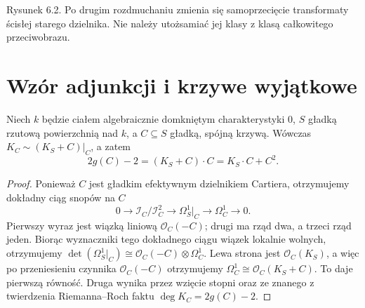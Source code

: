 \begin{center}
\begin{minipage}{\linewidth}
\centering
{}

{\small Rysunek 6.2. Po drugim rozdmuchaniu zmienia się samoprzecięcie transformaty ścisłej starego dzielnika. Nie należy utożsamiać jej klasy z klasą całkowitego przeciwobrazu.}\par
\end{minipage}
\end{center}

\section{Wzór adjunkcji i krzywe wyjątkowe}
\label{sec:ga6-adjunction}

\begin{twierdzenie}
\label{tw:ga6-adjunction}
Niech $k$ będzie ciałem algebraicznie domkniętym
charakterystyki $0$, $S$ gładką rzutową powierzchnią
nad $k$, a $C\subseteq S$ gładką, spójną krzywą.
Wówczas
$K_C\sim (K_S+C)|_C$, a zatem
\[
 2g(C)-2=(K_S+C)\cdot C=K_S\cdot C+C^2.
\]
\end{twierdzenie}
\begin{proof}
Ponieważ $C$ jest gładkim efektywnym dzielnikiem
Cartiera, otrzymujemy dokładny ciąg snopów na $C$
\[
0\longrightarrow\mathcal I_C/\mathcal I_C^2
 \longrightarrow\Omega^1_S|_C\longrightarrow\Omega^1_C
 \longrightarrow0.
\]
Pierwszy wyraz jest wiązką liniową
$\mathcal O_C(-C)$; drugi ma rząd dwa, a trzeci
rząd jeden. Biorąc wyznaczniki tego dokładnego
ciągu wiązek lokalnie wolnych, otrzymujemy
$\det(\Omega^1_S|_C)\cong
 \mathcal O_C(-C)\otimes\Omega^1_C$.
Lewa strona jest $\mathcal O_C(K_S)$,
a więc po przeniesieniu czynnika
$\mathcal O_C(-C)$ otrzymujemy
$\Omega_C^1\cong\mathcal O_C(K_S+C)$.
To daje pierwszą równość. Druga wynika przez
wzięcie stopni oraz ze znanego z twierdzenia
Riemanna--Roch faktu $\deg K_C=2g(C)-2$.
\end{proof}

